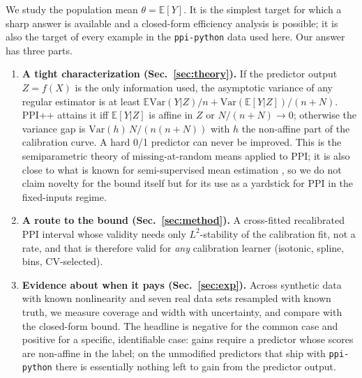 \documentclass{article}
\theoremstyle{remark}\newtheorem{remark}{Remark}
\begin{document}
We study the population mean $\theta=\mathbb E[Y]$. It is the simplest target for which a sharp answer is available and a closed-form efficiency analysis is possible; it is also the target of every example in the \texttt{ppi-python} data used here. Our answer has three parts.
\begin{enumerate}
\item \textbf{A tight characterization (Sec.~\ref{sec:theory}).} If the predictor output $Z=f(X)$ is the only information used, the asymptotic variance of any regular estimator is at least $\mathbb E\mathrm{Var}(Y|Z)/n+\mathrm{Var}(\mathbb E[Y|Z])/(n+N)$. PPI++ attains it iff $\mathbb E[Y|Z]$ is affine in $Z$ or $N/(n+N)\to0$; otherwise the variance gap is $\mathrm{Var}(h)\,N/(n(n+N))$ with $h$ the non-affine part of the calibration curve. A hard 0/1 predictor can never be improved. This is the semiparametric theory of missing-at-random means \citep{robins1994estimation,tsiatis2006semiparametric} applied to PPI; it is also close to what is known for semi-supervised mean estimation \citep{zhang2019semi}, so we do not claim novelty for the bound itself but for its use as a yardstick for PPI in the fixed-inputs regime.
\item \textbf{A route to the bound (Sec.~\ref{sec:method}).} A cross-fitted recalibrated PPI interval whose validity needs only $L^2$-stability of the calibration fit, not a rate, and that is therefore valid for \emph{any} calibration learner (isotonic, spline, bins, CV-selected).
\item \textbf{Evidence about when it pays (Sec.~\ref{sec:exp}).} Across synthetic data with known nonlinearity and seven real data sets resampled with known truth, we measure coverage and width with uncertainty, and compare with the closed-form bound. The headline is negative for the common case and positive for a specific, identifiable case: gains require a predictor whose scores are non-affine in the label; on the unmodified predictors that ship with \texttt{ppi-python} there is essentially nothing left to gain from the predictor output.
\end{enumerate}
\end{document}
